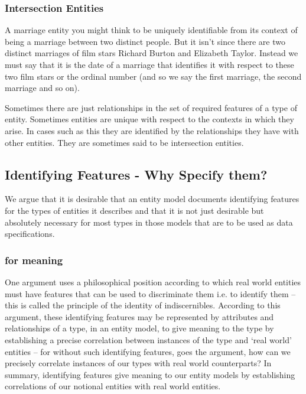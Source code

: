 \subsubsection{Intersection Entities}
 \begin{newtt}
\mynote
A marriage entity you might think to be uniquely identifiable from its context of being a marriage between two distinct people. But it isn't since there are two distinct marriages of film stars Richard Burton and Elizabeth Taylor. Instead we must say that it is the date of a marriage that identifies it with respect to these two film stars or the ordinal number (and so we say the first marriage, the second marriage and so on).

\mynote Sometimes there are just relationships in the set of required features of a type of entity. Sometimes entities are unique with respect to the contexts in which they arise. In cases such as this they are identified by the relationships they have with other entities. They are sometimes said to be intersection entities.
\end{newtt}

\subsection{Identifying Features - Why Specify them?}

\mynote 
We argue that it is desirable that an entity model documents identifying features for the types of entities it describes and that it is not just desirable but absolutely necessary for most types in those models that are to be used as data specifications. 

\subsubsection{for meaning}
\mynote 
One argument uses a philosophical position according to which real world entities must have features that can be used to discriminate them i.e. to identify them -- this is called the principle of the identity of indiscernibles. 
According to this argument, these identifying features may be 
represented by attributes and relationships of a type, in an entity model, to give meaning to the type
by establishing a precise correlation between instances of the type and 
`real world' entities -- for without such identifying features, goes the argument, how can we precisely correlate instances of our types with real world counterparts?
In summary, identifying features give meaning to our entity models by establishing correlations of our notional entities with real world entities.

